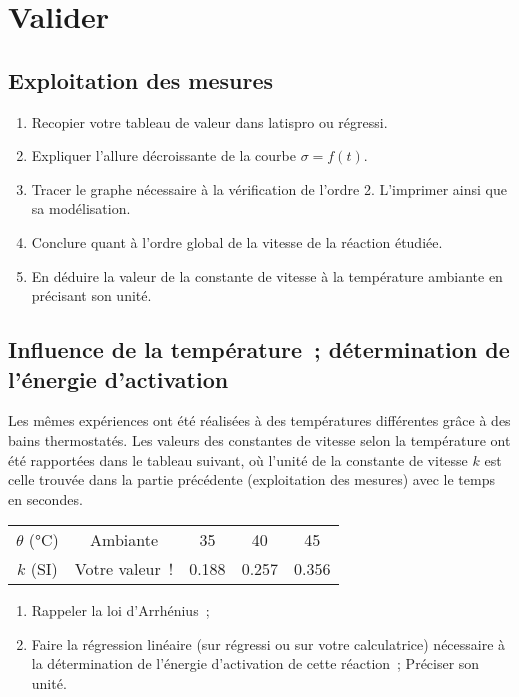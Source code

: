 \documentclass[../main/main.tex]{subfiles}
\begin{document}
\section{Valider}
\subsection{Exploitation des mesures}

\begin{enumerate}[label=\sqenumi, start=17]
	\item Recopier votre tableau de valeur dans latispro ou régressi.
	\item Expliquer l'allure décroissante de la courbe $\sigma = f(t)$.
	\item Tracer le graphe nécessaire à la vérification de l'ordre 2. L'imprimer
	      ainsi que sa modélisation.
	\item Conclure quant à l'ordre global de la vitesse de la réaction étudiée.
	\item En déduire la valeur de la constante de vitesse à la température
	      ambiante en précisant son unité.
\end{enumerate}

\subsection{Influence de la température~; détermination de l'énergie d'activation}

Les mêmes expériences ont été réalisées à des températures différentes grâce
à des bains thermostatés. Les valeurs des constantes de vitesse selon la
température ont été rapportées dans le tableau suivant, où l'unité de la
constante de vitesse $k$ est celle trouvée dans la partie précédente
(exploitation des mesures) avec le temps en secondes.

\begin{center}
	\begin{tabular}{ccccc}
		\toprule
		$\theta$ (\si{\degreeCelsius}) &
		Ambiante                       & 35          & 40          & 45          \\
		$k$ (\si{SI})                  &
		Votre valeur~!                 & \num{0.188} & \num{0.257} & \num{0.356} \\
		\bottomrule
	\end{tabular}
\end{center}

\begin{enumerate}[label=\sqenumi, start= 22]
	\item Rappeler la loi d'Arrhénius~;
	\item Faire la régression linéaire (sur régressi ou sur votre calculatrice)
	      nécessaire à la détermination de l'énergie d'activation de cette
	      réaction~; Préciser son unité.
\end{enumerate}
\end{document}
